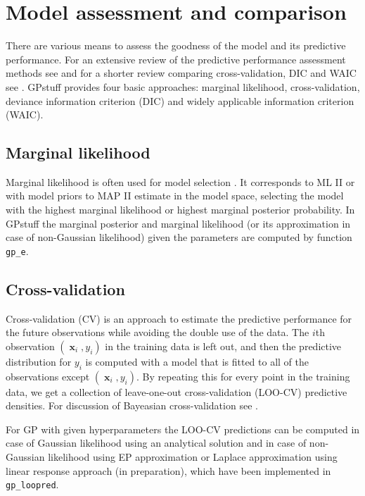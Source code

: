 \documentclass[twoside,11pt]{article}
\DeclareMathOperator{\x}{\mathbf{x}}
\newcommand{\pkg}[1]{{\fontseries{b}\selectfont #1}}
\newcommand{\code}[1]{{\normalfont\texttt{#1}}}
\begin{document}
\section{Model assessment and comparison}\label{sec:model_assessment}

There are various means to assess the goodness of the model and its
predictive performance. For an extensive review of the predictive
performance assessment methods see \citet{Vehtari+Ojanen:2012} and for
a shorter review comparing cross-validation, DIC and WAIC see
\citet{Gelman+Hwang+Vehtari:2013}. \pkg{GPstuff} provides four basic
approaches: marginal likelihood, cross-validation, deviance
information criterion (DIC) and widely applicable information
criterion (WAIC).

\subsection{Marginal likelihood}

Marginal likelihood is often used for model selection \citep[see,
e.g.][]{Kass+Raftery:1995}. It corresponds to ML II or with model
priors to MAP II estimate in the model space, selecting the model with
the highest marginal likelihood or highest marginal posterior
probability. 
%
In \pkg{GPstuff} the marginal posterior and marginal likelihood (or
its approximation in case of non-Gaussian likelihood) given the
parameters are computed by function \code{gp\_e}.

\subsection{Cross-validation}
\label{sec:cross-validation}

Cross-validation (CV) is an approach to estimate the predictive
performance for the future observations while avoiding the double use
of the data. The $i$th observation $(\x_{i},y_{i})$ in the training
data is left out, and then the predictive distribution for $y_i$ is
computed with a model that is fitted to all of the observations except
$(\x_i,y_i)$.
%
By repeating this for every point in the training data, we get a
collection of leave-one-out cross-validation (LOO-CV) predictive
densities.
%
For discussion of Bayeasian cross-validation see \citet{Vehtari+Lampinen:2002,Vehtari+Ojanen:2012,Gelman+Hwang+Vehtari:2013}.

For GP with given hyperparameters the LOO-CV predictions can be
computed in case of Gaussian likelihood using an analytical
solution \citep{Sundararajan+Keerthi:2001a} and in case of
non-Gaussian likelihood using EP approximation
\citep{Opper+Winther:2000,Rasmussen+Williams:2006} or Laplace
approximation using linear response approach (in preparation),
which have been implemented in \code{gp\_loopred}.
%
\end{document}
